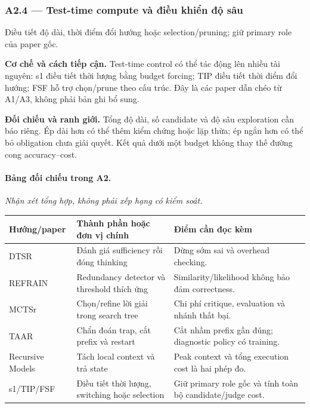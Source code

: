 \subsubsection*{A2.4 — Test-time compute và điều khiển độ sâu}
Điều tiết độ dài, thời điểm đổi hướng hoặc selection/pruning; giữ primary role của paper gốc.

\noindent\textbf{Cơ chế và cách tiếp cận.} Test-time control có thể tác động lên nhiều tài nguyên: s1 điều tiết thời lượng bằng budget forcing; TIP điều tiết thời điểm đổi hướng; FSF hỗ trợ chọn/prune theo cấu trúc. Đây là các paper dẫn chéo từ A1/A3, không phải bản ghi bổ sung.\par
\noindent\textbf{Đối chiếu và ranh giới.} Tổng độ dài, số candidate và độ sâu exploration cần báo riêng. Ép dài hơn có thể thêm kiểm chứng hoặc lặp thừa; ép ngắn hơn có thể bỏ obligation chưa giải quyết. Kết quả dưới một budget không thay thế đường cong accuracy–cost.\par

\begin{samepage}
\paragraph{Bảng đối chiếu trong A2.}
\noindent\textit{Nhận xét tổng hợp, không phải xếp hạng có kiểm soát.}
\begin{center}\small
\begin{tabularx}{\textwidth}{>{\raggedright\arraybackslash}p{2.7cm}>{\raggedright\arraybackslash}X>{\raggedright\arraybackslash}X}
\toprule
\textbf{Hướng/paper} & \textbf{Thành phần hoặc đơn vị chính} & \textbf{Điểm cần đọc kèm} \\
\midrule
DTSR & Đánh giá sufficiency rồi đóng thinking & Dừng sớm sai và overhead checking. \\
REFRAIN & Redundancy detector và threshold thích ứng & Similarity/likelihood không bảo đảm correctness. \\
MCTSr & Chọn/refine lời giải trong search tree & Chi phí critique, evaluation và nhánh thất bại. \\
TAAR & Chẩn đoán trap, cắt prefix và restart & Cắt nhầm prefix gần đúng; diagnostic policy có training. \\
Recursive Models & Tách local context và trả state & Peak context và tổng execution cost là hai phép đo. \\
s1/TIP/FSF & Điều tiết thời lượng, switching hoặc selection & Giữ primary role gốc và tính toàn bộ candidate/judge cost. \\
\bottomrule
\end{tabularx}
\end{center}
\end{samepage}
